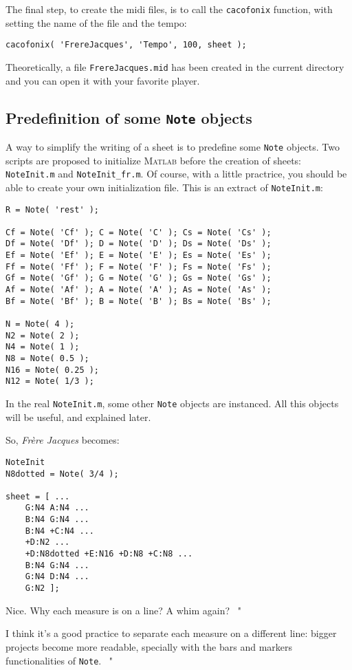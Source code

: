 \documentclass{article}
\newcommand\matlab{\textsc{Matlab}\xspace}
\newcommand\note{\lstinline!Note!\xspace}
\newcommand\frerejaques{\emph{Fr\`ere Jacques}\xspace}
\newcommand\noteInitFile{\texttt{NoteInit.m}\xspace}
\newcommand\noteInitFrFile{\texttt{NoteInit\_fr.m}\xspace}
\newenvironment{meenv}{ \par \noindent \makebox[6em][r]{ \textcolor{mecolor}{Me}: " --~}}{~"}
\newenvironment{myselfenv}{ \par \noindent \makebox[6em][r]{ \textcolor{myselfcolor}{Myself}: " --~}}{~"}
\newcommand{ \me }[1]{%
\begin{meenv}%
	#1%
\end{meenv} }
\newcommand{ \myself }[1]{%
\begin{myselfenv}%
	#1%
\end{myselfenv} }
\begin{document}
The final step, to create the midi files, is to call the \lstinline!cacofonix! function, with setting the name of the file and the tempo:
\begin{lstlisting}
cacofonix( 'FrereJacques', 'Tempo', 100, sheet );
\end{lstlisting}

Theoretically, a file \texttt{FrereJacques.mid} has been created in the current directory and you can open it with your favorite player.

\subsection{Predefinition of some \note objects}

A way to simplify the writing of a sheet is to predefine some \note objects. Two scripts are proposed to initialize \matlab before the creation of sheets: \noteInitFile and \noteInitFrFile. Of course, with a little practrice, you should be able to create your own initialization file. This is an extract of \noteInitFile:
\begin{lstlisting}
R = Note( 'rest' );

Cf = Note( 'Cf' ); C = Note( 'C' ); Cs = Note( 'Cs' );
Df = Note( 'Df' ); D = Note( 'D' ); Ds = Note( 'Ds' );
Ef = Note( 'Ef' ); E = Note( 'E' ); Es = Note( 'Es' );
Ff = Note( 'Ff' ); F = Note( 'F' ); Fs = Note( 'Fs' );
Gf = Note( 'Gf' ); G = Note( 'G' ); Gs = Note( 'Gs' );
Af = Note( 'Af' ); A = Note( 'A' ); As = Note( 'As' );
Bf = Note( 'Bf' ); B = Note( 'B' ); Bs = Note( 'Bs' );

N = Note( 4 );
N2 = Note( 2 );
N4 = Note( 1 );
N8 = Note( 0.5 );
N16 = Note( 0.25 );
N12 = Note( 1/3 );
\end{lstlisting}

In the real \noteInitFile, some other \note objects are instanced. All this objects will be useful, and explained later.

So, \frerejaques becomes:
\begin{lstlisting}
NoteInit
N8dotted = Note( 3/4 );

sheet = [ ...
	G:N4 A:N4 ...
	B:N4 G:N4 ...
	B:N4 +C:N4 ...
	+D:N2 ...
	+D:N8dotted +E:N16 +D:N8 +C:N8 ...
	B:N4 G:N4 ...
	G:N4 D:N4 ...
	G:N2 ];
\end{lstlisting}

\me{Nice. Why each measure is on a line? A whim again?}
\myself{I think it's a good practice to separate each measure on a different line: bigger projects become more readable, specially with the bars and markers functionalities of \note.}
\end{document}
